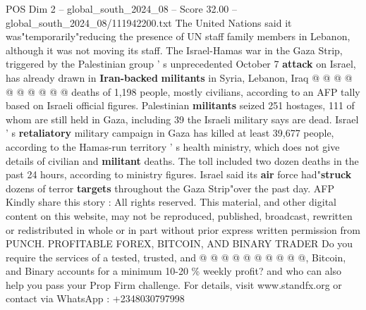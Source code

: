 \begin{textsample}{POS Dim 2 – global\_south\_2024\_08 – Score 32.00 – global\_south\_2024\_08/111942200.txt}
The United Nations said it was"temporarily"reducing the presence of UN staff family members in Lebanon, although it was not moving its staff.
The Israel-Hamas war in the Gaza Strip, triggered by the Palestinian group ' s unprecedented October 7 \textbf{attack} on Israel, has already drawn in \textbf{Iran-backed} \textbf{militants} in Syria, Lebanon, Iraq @ @ @ @ @ @ @ @ @ @ deaths of 1,198 people, mostly civilians, according to an AFP tally based on Israeli official figures.
Palestinian \textbf{militants} seized 251 hostages, 111 of whom are still held in Gaza, including 39 the Israeli military says are dead.
Israel ' s \textbf{retaliatory} military campaign in Gaza has killed at least 39,677 people, according to the Hamas-run territory ' s health ministry, which does not give details of civilian and \textbf{militant} deaths.
The toll included two dozen deaths in the past 24 hours, according to ministry figures.
Israel said its \textbf{air} force had"\textbf{struck} dozens of terror \textbf{targets} throughout the Gaza Strip"over the past day.
AFP Kindly share this story : All rights reserved.
This material, and other digital content on this website, may not be reproduced, published, broadcast, rewritten or redistributed in whole or in part without prior express written permission from PUNCH.
PROFITABLE FOREX, BITCOIN, AND BINARY TRADER Do you require the services of a tested, trusted, and @ @ @ @ @ @ @ @ @ @, Bitcoin, and Binary accounts for a minimum 10-20 \% weekly profit? and who can also help you pass your Prop Firm challenge.
For details, visit www.standfx.org or contact via WhatsApp : +2348030797998

\end{textsample}
